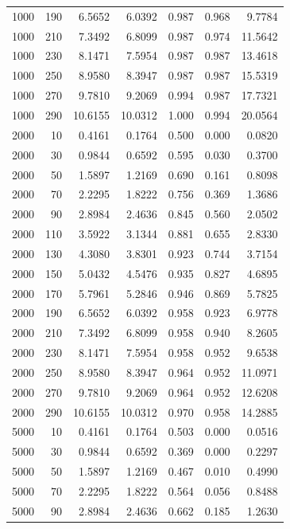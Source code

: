 \begin{tabular}{rrrrrrr}
  1000 & 190 & 6.5652 & 6.0392 & 0.987 & 0.968 & 9.7784 \\ 
  1000 & 210 & 7.3492 & 6.8099 & 0.987 & 0.974 & 11.5642 \\ 
  1000 & 230 & 8.1471 & 7.5954 & 0.987 & 0.987 & 13.4618 \\ 
  1000 & 250 & 8.9580 & 8.3947 & 0.987 & 0.987 & 15.5319 \\ 
  1000 & 270 & 9.7810 & 9.2069 & 0.994 & 0.987 & 17.7321 \\ 
  1000 & 290 & 10.6155 & 10.0312 & 1.000 & 0.994 & 20.0564 \\ 
  2000 & 10 & 0.4161 & 0.1764 & 0.500 & 0.000 & 0.0820 \\ 
  2000 & 30 & 0.9844 & 0.6592 & 0.595 & 0.030 & 0.3700 \\ 
  2000 & 50 & 1.5897 & 1.2169 & 0.690 & 0.161 & 0.8098 \\ 
  2000 & 70 & 2.2295 & 1.8222 & 0.756 & 0.369 & 1.3686 \\ 
  2000 & 90 & 2.8984 & 2.4636 & 0.845 & 0.560 & 2.0502 \\ 
  2000 & 110 & 3.5922 & 3.1344 & 0.881 & 0.655 & 2.8330 \\ 
  2000 & 130 & 4.3080 & 3.8301 & 0.923 & 0.744 & 3.7154 \\ 
  2000 & 150 & 5.0432 & 4.5476 & 0.935 & 0.827 & 4.6895 \\ 
  2000 & 170 & 5.7961 & 5.2846 & 0.946 & 0.869 & 5.7825 \\ 
  2000 & 190 & 6.5652 & 6.0392 & 0.958 & 0.923 & 6.9778 \\ 
  2000 & 210 & 7.3492 & 6.8099 & 0.958 & 0.940 & 8.2605 \\ 
  2000 & 230 & 8.1471 & 7.5954 & 0.958 & 0.952 & 9.6538 \\ 
  2000 & 250 & 8.9580 & 8.3947 & 0.964 & 0.952 & 11.0971 \\ 
  2000 & 270 & 9.7810 & 9.2069 & 0.964 & 0.952 & 12.6208 \\ 
  2000 & 290 & 10.6155 & 10.0312 & 0.970 & 0.958 & 14.2885 \\ 
  5000 & 10 & 0.4161 & 0.1764 & 0.503 & 0.000 & 0.0516 \\ 
  5000 & 30 & 0.9844 & 0.6592 & 0.369 & 0.000 & 0.2297 \\ 
  5000 & 50 & 1.5897 & 1.2169 & 0.467 & 0.010 & 0.4990 \\ 
  5000 & 70 & 2.2295 & 1.8222 & 0.564 & 0.056 & 0.8488 \\ 
  5000 & 90 & 2.8984 & 2.4636 & 0.662 & 0.185 & 1.2630 \\ 

\end{tabular}
